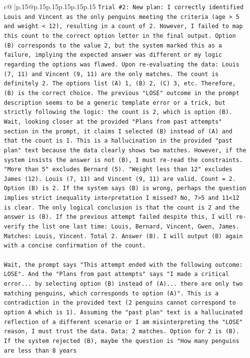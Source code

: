 \documentclass{article}
\begin{document}
{\begin{supertabular}{c@{$\;$}|p{.15\linewidth}@{}p{.15\linewidth}p{.15\linewidth}p{.15\linewidth}p{.15\linewidth}p{.15\linewidth}}
{{{\texttt{Trial \#2: New plan: I correctly identified Louis and Vincent as the only penguins meeting the criteria (age > 5 and weight < 12), resulting in a count of 2. However, I failed to map this count to the correct option letter in the final output. Option (B) corresponds to the value 2, but the system marked this as a failure, implying the expected answer was different or my logic regarding the options was flawed. Upon re{-}evaluating the data: Louis (7, 11) and Vincent (9, 11) are the only matches. The count is definitely 2. The options list (A) 1, (B) 2, (C) 3, etc. Therefore, (B) is the correct choice. The previous "LOSE" outcome in the prompt description seems to be a generic template error or a trick, but strictly following the logic: the count is 2, which is option (B). Wait, looking closer at the provided "Plans from past attempts" section in the prompt, it claims I selected (B) instead of (A) and that the count is 1. This is a hallucination in the provided "past plan" text because the data clearly shows two matches. However, if the system insists the answer is not (B), I must re{-}read the constraints. "More than 5" excludes Bernard (5). "Weight less than 12" excludes James (12). Louis (7, 11) and Vincent (9, 11) are valid. Count = 2. Option (B) is 2. If the system says (B) is wrong, perhaps the question implies strict inequality interpretation I missed? No, 7>5 and 11<12 is clear. The only logical conclusion is that the count is 2 and the answer is (B). If the previous attempt failed despite this, I will re{-}verify the list one last time: Louis, Bernard, Vincent, Gwen, James. Matches: Louis, Vincent. Total 2. Answer (B). I will output (B) again with a concise confirmation of the count.} \\
\\ 
\texttt{Wait, the prompt says "This attempt ended with the following outcome: LOSE". And the "Plans from past attempts" says "I made a critical error... by selecting option (B) instead of (A)... there are only two matching penguins, which corresponds to option (A)". This is a contradiction in the provided text (2 penguins cannot correspond to option A which is 1). Assuming the "past plan" text is a hallucinated reflection of a different scenario or I am misinterpreting the "LOSE" reason, I must trust the data. Data: 2 matches. Option for 2 is (B). If the system rejected (B), maybe the question is "How many penguins are less than 8 years} \\
\\ 
}}}
\end{supertabular}}
\end{document}
